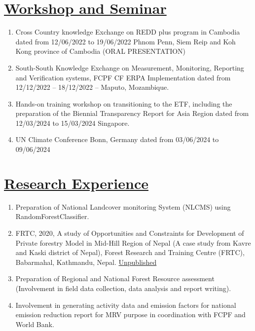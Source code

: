 \documentclass[
]{article}
\providecommand{\tightlist}{%
  \setlength{\itemsep}{0pt}\setlength{\parskip}{0pt}}
\begin{document}
\section{\texorpdfstring{\underline{Workshop and Seminar}}{}}\label{section-6}

\begin{enumerate}
\def\labelenumi{\arabic{enumi}.}
\tightlist
\item
  Cross Country knowledge Exchange on REDD plus program in Cambodia
  dated from 12/06/2022 to 19/06/2022 Phnom Penn, Siem Reip and Koh Kong
  province of Cambodia (ORAL PRESENTATION)
\item
  South-South Knowledge Exchange on Measurement, Monitoring, Reporting
  and Verification systems, FCPF CF ERPA Implementation dated from
  12/12/2022 -- 18/12/2022 -- Maputo, Mozambique.
\item
  Hands-on training workshop on transitioning to the ETF, including the
  preparation of the Biennial Transparency Report for Asia Region dated
  from 12/03/2024 to 15/03/2024 Singapore.
\item
  UN Climate Conference Bonn, Germany dated from 03/06/2024 to
  09/06/2024
\end{enumerate}

\newpage

\section{\texorpdfstring{\underline{Research Experience}}{}}\label{section-7}

\begin{enumerate}
\def\labelenumi{\arabic{enumi}.}
\tightlist
\item
  Preparation of National Landcover monitoring System (NLCMS) using
  RandomForestClassifier.
\item
  FRTC, 2020, A study of Opportunities and Constraints for Development
  of Private forestry Model in Mid-Hill Region of Nepal (A case study
  from Kavre and Kaski district of Nepal), Forest Research and Training
  Centre (FRTC), Babarmahal, Kathmandu, Nepal.
  \href{https://frtc.gov.np/uploads/files/Private\%20forest\%20Model(1).pdf}{Unpublished}
\item
  Preparation of Regional and National Forest Resource assessment
  (Involvement in field data collection, data analysis and report
  writing).
\item
  Involvement in generating activity data and emission factors for
  national emission reduction report for MRV purpose in coordination
  with FCPF and World Bank.
\end{enumerate}
\end{document}
